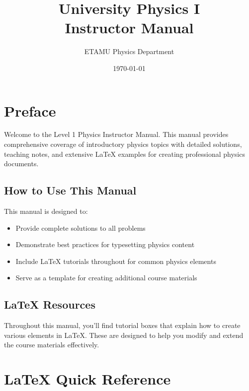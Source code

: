 \documentclass[11pt]{book}
\title{University Physics I\\Instructor Manual}
\author{ETAMU Physics Department}
\date{\today}
\begin{document}
\frontmatter
\maketitle

\tableofcontents
\listoffigures

\chapter{Preface}

Welcome to the Level 1 Physics Instructor Manual. This manual provides comprehensive coverage of introductory physics topics with detailed solutions, teaching notes, and extensive LaTeX examples for creating professional physics documents.

\section{How to Use This Manual}

This manual is designed to:
\begin{itemize}
    \item Provide complete solutions to all problems
    \item Demonstrate best practices for typesetting physics content
    \item Include LaTeX tutorials throughout for common physics elements
    \item Serve as a template for creating additional course materials
\end{itemize}

\section{LaTeX Resources}

Throughout this manual, you'll find tutorial boxes that explain how to create various elements in LaTeX. These are designed to help you modify and extend the course materials effectively.


\mainmatter




\backmatter

\appendix

\chapter{LaTeX Quick Reference}
\end{document}
